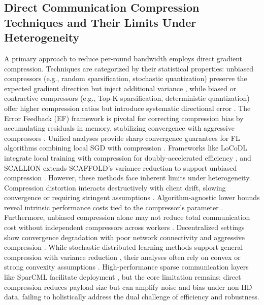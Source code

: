 \documentclass[11pt]{article}
\begin{document}
\subsection{Direct Communication Compression Techniques and Their Limits Under Heterogeneity}
A primary approach to reduce per-round bandwidth employs direct gradient compression. Techniques are categorized by their statistical properties: unbiased compressors (e.g., random sparsification, stochastic quantization) preserve the expected gradient direction but inject additional variance \citep{konevcny2016federated, He2023UnbiasedCS}, while biased or contractive compressors (e.g., Top-K sparsification, deterministic quantization) offer higher compression ratios but introduce systematic directional error \citep{Haddadpour2020FederatedLW}. The Error Feedback (EF) framework is pivotal for correcting compression bias by accumulating residuals in memory, stabilizing convergence with aggressive compressors \citep{Tang2019DoubleSqueezePS, Fatkhullin2023MomentumPI, Qian2020ErrorCD}. Unified analyses provide sharp convergence guarantees for FL algorithms combining local SGD with compression \citep{Haddadpour2020FederatedLW, basu2019qsparse}. Frameworks like LoCoDL integrate local training with compression for doubly-accelerated efficiency \citep{Condat2024LoCoDLCD}, and SCALLION extends SCAFFOLD's variance reduction to support unbiased compression \citep{Huang2023StochasticCA}. However, these methods face inherent limits under heterogeneity. Compression distortion interacts destructively with client drift, slowing convergence or requiring stringent assumptions \citep{li2019convergence, basu2019qsparse}. Algorithm-agnostic lower bounds reveal intrinsic performance costs tied to the compressor's parameter \citep{He2023LowerBA}. Furthermore, unbiased compression alone may not reduce total communication cost without independent compressors across workers \citep{He2023UnbiasedCS}. Decentralized settings show convergence degradation with poor network connectivity and aggressive compression \citep{Koloskova2019DecentralizedSO}. While stochastic distributed learning methods support general compression with variance reduction \citep{horvath2023stochastic}, their analyses often rely on convex or strong convexity assumptions \citep{horvath2023stochastic, zhou2021communication}. High-performance sparse communication layers like SparCML facilitate deployment \citep{Renggli2018SparCMLHS}, but the core limitation remains: direct compression reduces payload size but can amplify noise and bias under non-IID data, failing to holistically address the dual challenge of efficiency and robustness.
\end{document}
